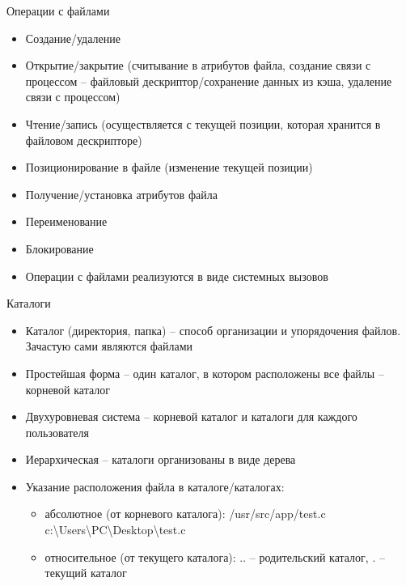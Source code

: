 \documentclass[aspectratio=169,14pt]{beamer}
\begin{document}
\begin{frame}{Операции с файлами}
    \begin{footnotesize}
    \begin{itemize}
        \item Создание/удаление
        \item Открытие/закрытие (считывание в атрибутов файла, создание связи с процессом – файловый дескриптор/сохранение данных из кэша, удаление связи с процессом)
        \item Чтение/запись (осуществляется с текущей позиции, которая хранится в файловом дескрипторе)
        \item Позиционирование в файле (изменение текущей позиции)
        \item Получение/установка атрибутов файла
        \item Переименование
        \item Блокирование
        \item Операции с файлами реализуются в виде системных вызовов
    \end{itemize}
    \end{footnotesize}
\end{frame}

\begin{frame}{Каталоги}
    \begin{itemize}
        \item Каталог (директория, папка) – способ организации и упорядочения файлов. Зачастую сами являются файлами
        \item Простейшая форма – один каталог, в котором расположены все файлы – корневой каталог
        \item Двухуровневая система – корневой каталог и каталоги для каждого пользователя
        \item Иерархическая – каталоги организованы в виде дерева
        \item Указание расположения файла в каталоге/каталогах:
        \begin{itemize}
            \item абсолютное (от корневого каталога): /usr/src/app/test.c c:\textbackslash Users\textbackslash PC\textbackslash Desktop\textbackslash test.c
            \item относительное (от текущего каталога): .. – родительский каталог, . – текущий каталог
        \end{itemize}
    \end{itemize}
\end{frame}
\end{document}
